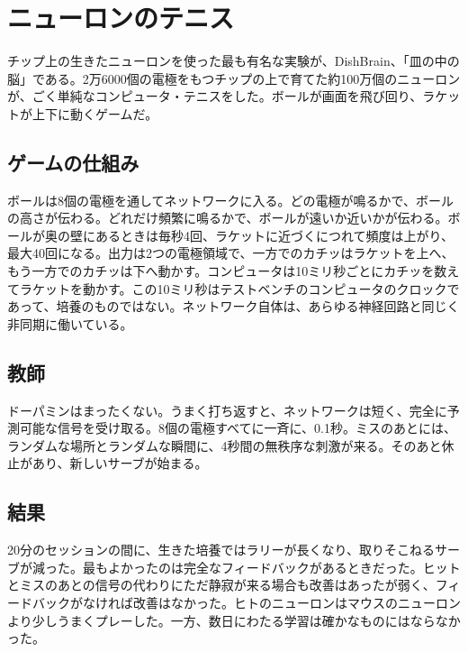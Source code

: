 \chapter{ニューロンのテニス}

チップ上の生きたニューロンを使った最も有名な実験が、DishBrain、「皿の中の脳」である。2万6000個の電極をもつチップの上で育てた約100万個のニューロンが、ごく単純なコンピュータ・テニスをした。ボールが画面を飛び回り、ラケットが上下に動くゲームだ。

\section*{ゲームの仕組み}

ボールは8個の電極を通してネットワークに入る。どの電極が鳴るかで、ボールの高さが伝わる。どれだけ頻繁に鳴るかで、ボールが遠いか近いかが伝わる。ボールが奥の壁にあるときは毎秒4回、ラケットに近づくにつれて頻度は上がり、最大40回になる。出力は2つの電極領域で、一方でのカチッはラケットを上へ、もう一方でのカチッは下へ動かす。コンピュータは10ミリ秒ごとにカチッを数えてラケットを動かす。この10ミリ秒はテストベンチのコンピュータのクロックであって、培養のものではない。ネットワーク自体は、あらゆる神経回路と同じく非同期に働いている。


\section*{教師}

ドーパミンはまったくない。うまく打ち返すと、ネットワークは短く、完全に予測可能な信号を受け取る。8個の電極すべてに一斉に、0.1秒。ミスのあとには、ランダムな場所とランダムな瞬間に、4秒間の無秩序な刺激が来る。そのあと休止があり、新しいサーブが始まる。

\section*{結果}

20分のセッションの間に、生きた培養ではラリーが長くなり、取りそこねるサーブが減った。最もよかったのは完全なフィードバックがあるときだった。ヒットとミスのあとの信号の代わりにただ静寂が来る場合も改善はあったが弱く、フィードバックがなければ改善はなかった。ヒトのニューロンはマウスのニューロンより少しうまくプレーした。一方、数日にわたる学習は確かなものにはならなかった。

